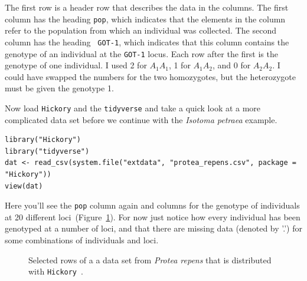 \documentclass[12pt]{article}
\begin{document}
The first row is a header row that describes the data in the
columns. The first column has the heading {\tt pop}, which indicates
that the elements in the column refer to the population from which an
individual was collected. The second column has the heading {\tt
  GOT-1}, which indicates that this column contains the genotype of an
individual at the {\tt GOT-1} locus. Each row after the first is the
genotype of one individual. I used 2 for $A_1A_1$, 1 for $A_1A_2$, and
0 for $A_2A_2$. I could have swapped the numbers for the two
homozygotes, but the heterozygote must be given the genotype 1.

Now load {\tt Hickory} and the {\tt tidyverse} and take a quick look
at a more complicated data set before we continue with the {\it
  Isotoma petraea\/} example.

\begin{verbatim}
library("Hickory")
library("tidyverse")
dat <- read_csv(system.file("extdata", "protea_repens.csv", package = "Hickory"))
view(dat)
\end{verbatim}

\noindent Here you'll see the {\tt pop} column again and columns for
the genotype of individuals at 20 different
loci~(Figure~\ref{fig:repens-csv}). For now just notice how
every individual has been genotyped at a number of loci, and that
there are missing data (denoted by '.') for some combinations of
individuals and loci.

\begin{figure}
  \begin{center}
  \end{center}
\caption{Selected rows of a a data set from {\it Protea repens\/} that
  is distributed with {\tt Hickory}~\cite{Prunier-etal-2017}.}\label{fig:repens-csv}
\end{figure}
\end{document}
